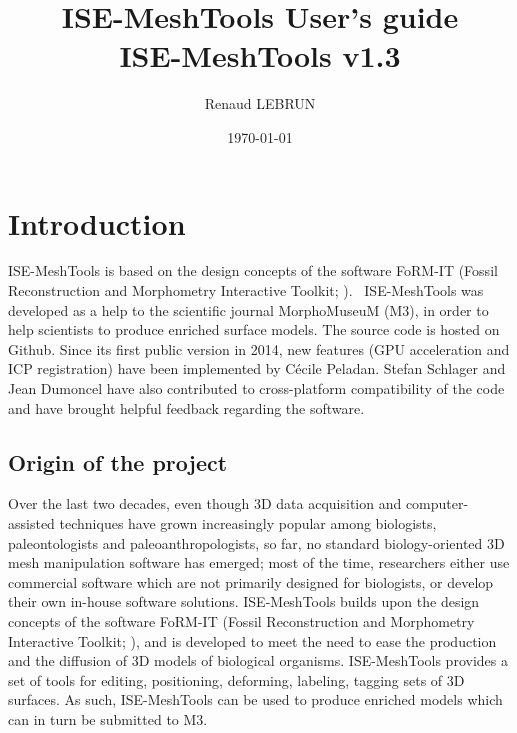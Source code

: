\documentclass[12pt, a4paper]{book}
\title{ISE-MeshTools User's guide\\ISE-MeshTools v1.3}
\author{Renaud LEBRUN}
\affil{Institut des Sciences de l'Evolution, University of Montpellier, France}
\date{\today}
\begin{document}
	\dominitoc

\maketitle
 

\tableofcontents

\chapter*{Introduction}


\minitoc 

 ISE-MeshTools is based on the design concepts of the software FoRM-IT (Fossil Reconstruction and Morphometry Interactive Toolkit; \citep{Zollikofer1995,Zollikofer2005}).
\ ISE-MeshTools\citep{Lebrun2014} was developed as a help to the scientific journal MorphoMuseuM (M3), in order to help scientists to produce enriched surface models. The source code is hosted on Github. Since its first public version in 2014, new features (GPU acceleration and ICP registration) have been implemented by Cécile Peladan. Stefan Schlager and Jean Dumoncel have also contributed to cross-platform compatibility of the code and have brought helpful feedback regarding the software.  
\section*{Origin of the project}
Over the last two decades, even though 3D data acquisition and computer-assisted techniques have grown increasingly popular among biologists, paleontologists and paleoanthropologists, so far, no standard biology-oriented 3D mesh manipulation software has emerged; most of the time, researchers either use commercial software which are not primarily designed for biologists, or develop their own in-house software solutions.  ISE-MeshTools builds upon the design concepts of the software FoRM-IT (Fossil Reconstruction and Morphometry Interactive Toolkit; \citep{Zollikofer1995,Zollikofer2005}), and is developed to meet the need to ease the production and the diffusion of 3D models of biological organisms. ISE-MeshTools provides a set of tools for editing, positioning, deforming, labeling, tagging sets of 3D surfaces. As such, ISE-MeshTools can be used to produce enriched models which can in turn be submitted to M3.
\end{document}
